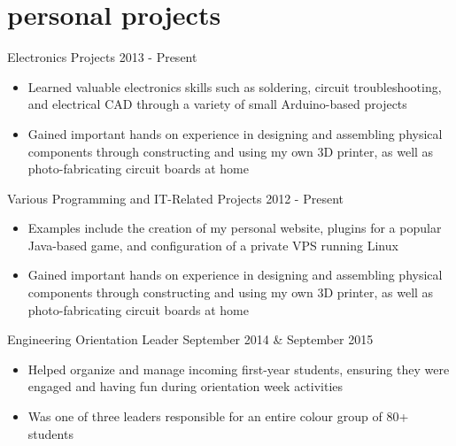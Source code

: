 \documentclass[hidelinks]{kkurucz-cv}
\begin{document}

\section{personal projects}
\begin{entrylist}
\entry
{\vspace{-8mm}\null}
{Electronics Projects}
{2013 - Present}
{
\vspace{-3mm}
\begin{itemize}
	\item Learned valuable electronics skills such as soldering, circuit troubleshooting, and electrical CAD through a variety of small Arduino-based projects
	\item Gained important hands on experience in designing and assembling physical components through constructing and using my own 3D printer, as well as photo-fabricating circuit boards at home
\end{itemize}
}
{\null}
\entry
{\vspace{-8mm}\null}
{Various Programming and IT-Related Projects}
{2012 - Present}
{
\vspace{-3mm}
\begin{itemize}
	\item Examples include the creation of my personal website, plugins for a popular Java-based game, and configuration of a private VPS running Linux
	\item Gained important hands on experience in designing and assembling physical components through constructing and using my own 3D printer, as well as photo-fabricating circuit boards at home
\end{itemize}
}
{\null}
\entry
{\vspace{-8mm}\null}
{Engineering Orientation Leader}
{September 2014 \& September 2015}
{
\vspace{-3mm}
\begin{itemize}
	\item Helped organize and manage incoming first-year students, ensuring they were engaged and having fun during orientation week activities
	\item Was one of three leaders responsible for an entire colour group of 80+ students
	\end{itemize}
}
{\null}
\end{entrylist}
\end{document}
